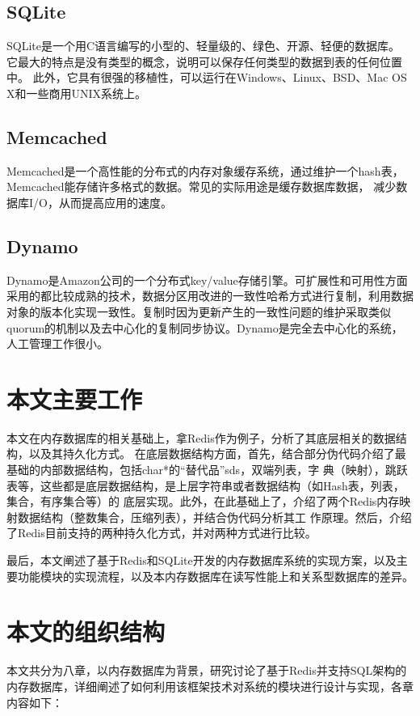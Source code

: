 \documentclass{zjutthesis}
\begin{document}
\subsection{SQLite}
SQLite\cite{web:SQLite}是一个用C语言编写的小型的、轻量级的、绿色、开源、轻便的数据库。
它最大的特点是没有类型的概念，说明可以保存任何类型的数据到表的任何位置中。
此外，它具有很强的移植性，可以运行在Windows、Linux、BSD、Mac OS X和一些商用UNIX系统上。

\subsection{Memcached}
Memcached\cite{fitzpatrick2009memcached}是一个高性能的分布式的内存对象缓存系统\cite{2008memcached}，通过维护一个hash表，Memcached能存储许多格式的数据。常见的实际用途是缓存数据库数据，
减少数据库I/O，从而提高应用的速度。

\subsection{Dynamo}
Dynamo\cite{decandia2007dynamo}是Amazon公司的一个分布式key/value存储引擎。可扩展性和可用性方面采用的都比较成熟的技术，数据分区用改进的一致性哈希方式进行复制，利用数据对象的版本化实现一致性。复制时因为更新产生的一致性问题的维护采取类似quorum的机制以及去中心化的复制同步协议。Dynamo是完全去中心化的系统，人工管理工作很小。

\section{本文主要工作}
本文在内存数据库的相关基础上，拿Redis作为例子，分析了其底层相关的数据结构，以及其持久化方式。
在底层数据结构方面，首先，结合部分伪代码介绍了最基础的内部数据结构，包括char*的“替代品”sds，双端列表，字
典（映射），跳跃表等，这些都是底层数据结构，是上层字符串或者数据结构（如Hash表，列表，集合，有序集合等）的
底层实现。此外，在此基础上了，介绍了两个Redis内存映射数据结构（整数集合，压缩列表），并结合伪代码分析其工
作原理。然后，介绍了Redis目前支持的两种持久化方式，并对两种方式进行比较。

最后，本文阐述了基于Redis和SQLite开发的内存数据库系统的实现方案，以及主要功能模块的实现流程，以及本内存数据库在读写性能上和关系型数据库的差异。

\section{本文的组织结构}
本文共分为八章，以内存数据库为背景，研究讨论了基于Redis并支持SQL架构的内存数据库，详细阐述了如何利用该框架技术对系统的模块进行设计与实现，各章内容如下：
\end{document}
